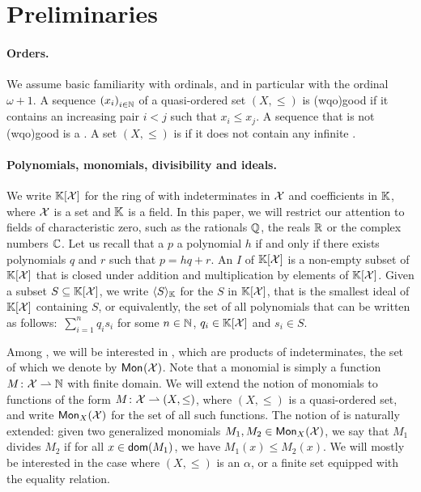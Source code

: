 \section{Preliminaries}
\label{sec:preliminaries}

\paragraph{Orders.} We assume basic familiarity with ordinals, and in
particular with the ordinal $\omega+1$. A sequence $\seqof{x_i}[i \in \N]$ of a
quasi-ordered set $(X,\leq)$ is \intro(wqo){good} if it contains an increasing
pair $i < j$ such that $x_i \leq x_j$. A sequence that is not \kl(wqo){good} is
a . A set $(X,\leq)$ is  if it
does not contain any infinite .

\paragraph{Polynomials, monomials, divisibility and
ideals.} We write $\poly{\K}{\X}$ for the ring of
 with indeterminates in $\X$ and
coefficients in $\K$, where $\X$ is a set and $\K$ is a
field. In this paper, we will restrict our attention to
fields of characteristic zero, such as the rationals
$\Q$, the reals $\R$ or the complex numbers $\C$.
Let us
recall that a  $p$  a
polynomial $h$ if and only if there exists polynomials
$q$ and $r$ such that $p = h q + r$. An  $I$
of $\poly{\K}{\X}$ is a non-empty subset of
$\poly{\K}{\X}$ that is closed under addition and
multiplication by elements of $\poly{\K}{\X}$. Given a
subset $S \subseteq \poly{\K}{\X}$, we write
$\gen{S}{\K}$ for the  $S$ in
$\poly{\K}{\X}$, that is the smallest ideal of
$\poly{\K}{\X}$ containing $S$, or equivalently, the set
of all polynomials that can be written as follows:
$\,\sum_{i=1}^n q_i s_i$ for some $n \in \N$, $q_i \in
\poly{\K}{\X}$ and $s_i \in S$.

\AP Among , we will be interested in , which
are products of indeterminates, the set of which we denote by $\mon{\X}$. Note
that a monomial is simply a function $M \colon \X \topartial \N$ with finite
domain. We will extend the notion of monomials to functions of the form $M
\colon \X \topartial (X, \leq)$, where $(X, \leq)$ is a quasi-ordered set, and
write $\mon[X]{\X}$ for the set of all such functions. The notion of
 is naturally extended: given two generalized monomials $M_1,
M_2 \in \mon[X]{\X}$, we say that $M_1$ divides $M_2$ if for all $x \in
\dom(M_1)$, we have $M_1(x) \leq M_2(x)$. We will mostly be interested in the
case where $(X, \leq)$ is an  $\alpha$, or a finite set equipped
with the equality relation.


